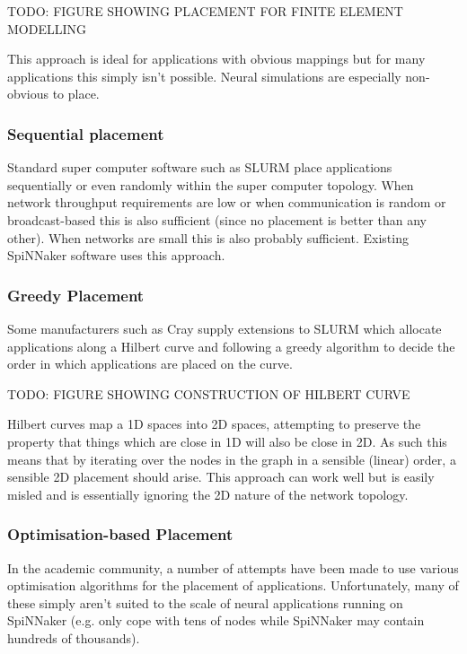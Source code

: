 				TODO: FIGURE SHOWING PLACEMENT FOR FINITE ELEMENT MODELLING
				
				This approach is ideal for applications with obvious mappings but for
				many applications this simply isn't possible. Neural simulations are
				especially non-obvious to place.
			
			\subsubsection{Sequential placement}
				
				Standard super computer software such as SLURM place applications
				sequentially or even randomly within the super computer topology. When
				network throughput requirements are low or when communication is random
				or broadcast-based this is also sufficient (since no placement is
				better than any other). When networks are small this is also probably
				sufficient. Existing SpiNNaker software uses this approach.
			
			\subsubsection{Greedy Placement}
				
				Some manufacturers such as Cray supply extensions to SLURM which
				allocate applications along a Hilbert curve and following a greedy
				algorithm to decide the order in which applications are placed on the
				curve.
				
				TODO: FIGURE SHOWING CONSTRUCTION OF HILBERT CURVE
				
				Hilbert curves map a 1D spaces into 2D spaces, attempting to preserve
				the property that things which are close in 1D will also be close in
				2D. As such this means that by iterating over the nodes in the graph in
				a sensible (linear) order, a sensible 2D placement should arise. This
				approach can work well but is easily misled and is essentially ignoring
				the 2D nature of the network topology.
			
			\subsubsection{Optimisation-based Placement}
				
				In the academic community, a number of attempts have been made to use
				various optimisation algorithms for the placement of applications.
				Unfortunately, many of these simply aren't suited to the scale of
				neural applications running on SpiNNaker (e.g. only cope with tens of
				nodes while SpiNNaker may contain hundreds of thousands).
				

